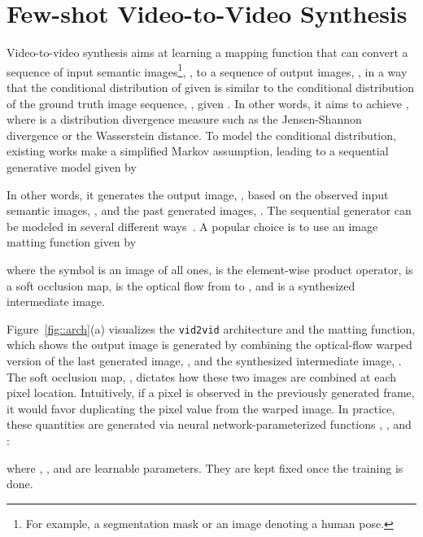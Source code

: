\documentclass{article}
\newcommand{\vidtovid}{{\texttt{vid2vid}}\xspace}
\begin{document}
\section{Few-shot Video-to-Video Synthesis}
\vspace{-2mm}

Video-to-video synthesis aims at learning a mapping function that can convert a sequence of input semantic images\footnote{For example, a segmentation mask or an image denoting a human pose.}, , to a sequence of output images, , in a way that the conditional distribution of  given  is similar to the conditional distribution of the ground truth image sequence, , given . In other words, it aims to achieve , where  is a distribution divergence measure such as the Jensen-Shannon divergence or the Wasserstein distance. To model the conditional distribution, existing works make a simplified Markov assumption, leading to a sequential generative model given by 

In other words, it generates the output image, , based on the observed  input semantic images, , and the past  generated images, . The sequential generator  can be modeled in several different ways~\cite{chan2018everybody,gafni2019vid2game,wang2018video,zhou2019dance}. A popular choice is to use an image matting function given by

where the symbol  is an image of all ones,  is the element-wise product operator,  is a soft occlusion map,  is the optical flow from  to , and  is a synthesized intermediate image. 

Figure~\ref{fig::arch}(a) visualizes the \vidtovid architecture and the matting function, which shows the output image  is generated by combining the optical-flow warped version of the last generated image, , and the synthesized intermediate image, . The soft occlusion map, , dictates how these two images are combined at each pixel location. Intuitively, if a pixel is observed in the previously generated frame, it would favor duplicating the pixel value from the warped image. In practice, these quantities are generated via neural network-parameterized functions , , and : 

where , , and  are learnable parameters. They are kept fixed once the training is done. 
\end{document}
